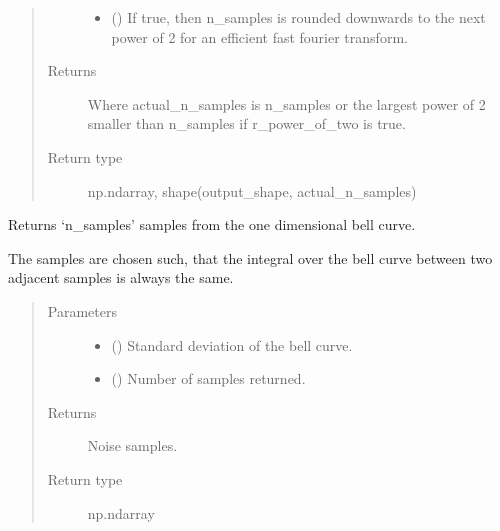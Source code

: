 \documentclass[letterpaper,10pt,english]{sphinxmanual}
\begin{document}
\begin{fulllineitems}
\begin{quote}
\begin{description}
\begin{itemize}
\item {} 
 () \textendash{} If true, then n\_samples is rounded downwards to the next power of 2 for
an efficient fast fourier transform.

\end{itemize}

\item[{Returns}] \leavevmode
{} \textendash{} Where actual\_n\_samples is n\_samples or the largest power of 2 smaller
than n\_samples if r\_power\_of\_two is true.

\item[{Return type}] \leavevmode
np.ndarray, shape(output\_shape, actual\_n\_samples)

\end{description}\end{quote}

\end{fulllineitems}


\begin{fulllineitems}
\label{\detokenize{qsim:qsim.noise.sample_1dim_gaussian_distribution}}
Returns ‘n\_samples’ samples from the one dimensional bell curve.

The samples are chosen such, that the integral over the bell curve between
two adjacent samples is always the same.
\begin{quote}\begin{description}
\item[{Parameters}] \leavevmode\begin{itemize}
\item {} 
 () \textendash{} Standard deviation of the bell curve.

\item {} 
 () \textendash{} Number of samples returned.

\end{itemize}

\item[{Returns}] \leavevmode
{} \textendash{} Noise samples.

\item[{Return type}] \leavevmode
np.ndarray

\end{description}\end{quote}

\end{fulllineitems}
\end{document}
